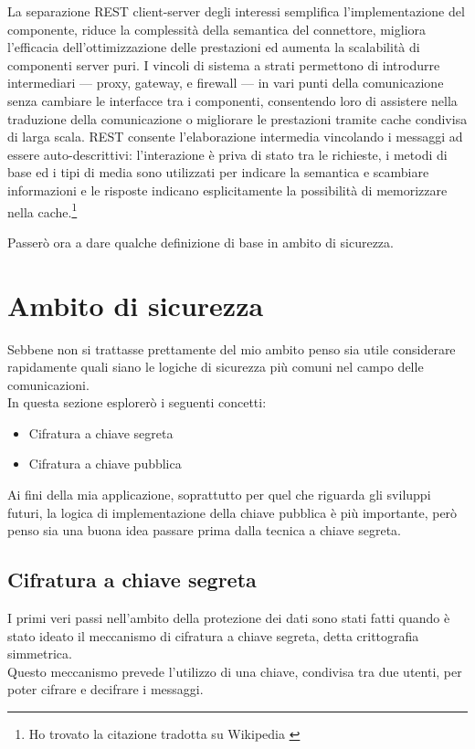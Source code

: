 \begin{displayquote}
La separazione REST client-server degli interessi semplifica l'implementazione del componente, riduce la complessità della semantica del connettore, migliora l'efficacia dell'ottimizzazione delle prestazioni ed aumenta la scalabilità di componenti server puri. I vincoli di sistema a strati permettono di introdurre intermediari — proxy, gateway, e firewall — in vari punti della comunicazione senza cambiare le interfacce tra i componenti, consentendo loro di assistere nella traduzione della comunicazione o migliorare le prestazioni tramite cache condivisa di larga scala. REST consente l'elaborazione intermedia vincolando i messaggi ad essere auto-descrittivi: l'interazione è priva di stato tra le richieste, i metodi di base ed i tipi di media sono utilizzati per indicare la semantica e scambiare informazioni e le risposte indicano esplicitamente la possibilità di memorizzare nella cache.\footnote{
Ho trovato la citazione tradotta su Wikipedia \cite{RESTWikipedia}
}
\end{displayquote}

Passerò ora a dare qualche definizione di base in ambito di sicurezza.

\section{Ambito di sicurezza}
Sebbene non si trattasse prettamente del mio ambito penso sia utile considerare rapidamente quali siano le logiche di sicurezza più comuni nel campo delle comunicazioni.
\\
In questa sezione esplorerò i seguenti concetti:
\begin{itemize}
    \item Cifratura a chiave segreta
    \item Cifratura a chiave pubblica
\end{itemize}
Ai fini della mia applicazione, soprattutto per quel che riguarda gli sviluppi futuri, la logica di implementazione della chiave pubblica è più importante, però penso sia una buona idea passare prima dalla tecnica a chiave segreta.

\subsection{Cifratura a chiave segreta}
I primi veri passi nell'ambito della protezione dei dati sono stati fatti quando è stato ideato il meccanismo di cifratura a chiave segreta, detta crittografia simmetrica.
\\
Questo meccanismo prevede l'utilizzo di una chiave, condivisa tra due utenti, per poter cifrare e decifrare i messaggi.

